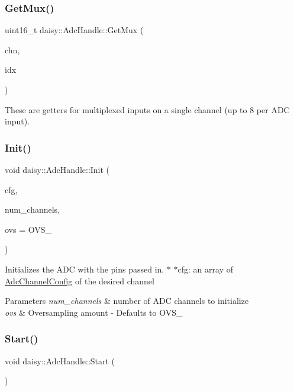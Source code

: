 \subsubsection{\texorpdfstring{Get\+Mux()}{GetMux()}}
{\footnotesize\ttfamily uint16\+\_\+t daisy\+::\+Adc\+Handle\+::\+Get\+Mux (\begin{DoxyParamCaption}\item[{uint8\+\_\+t}]{chn,  }\item[{uint8\+\_\+t}]{idx }\end{DoxyParamCaption})}

These are getters for multiplexed inputs on a single channel (up to 8 per A\+DC input). \mbox{\label{classdaisy_1_1_adc_handle_ab93340170ed44feced69fcdafc6c13ed}} 
\subsubsection{\texorpdfstring{Init()}{Init()}}
{\footnotesize\ttfamily void daisy\+::\+Adc\+Handle\+::\+Init (\begin{DoxyParamCaption}\item[{\hyperlink{structdaisy_1_1_adc_channel_config}{Adc\+Channel\+Config} $\ast$}]{cfg,  }\item[{size\+\_\+t}]{num\+\_\+channels,  }\item[{Over\+Sampling}]{ovs = {\ttfamily OVS\+\_} }\end{DoxyParamCaption})}

Initializes the A\+DC with the pins passed in. $\ast$ $\ast$cfg\+: an array of \hyperlink{structdaisy_1_1_adc_channel_config}{Adc\+Channel\+Config} of the desired channel 
\begin{DoxyParams}{Parameters}
{\em num\+\_\+channels} & number of A\+DC channels to initialize \\
\hline
{\em ovs} & Oversampling amount -\/ Defaults to O\+V\+S\+\_ \\
\hline
\end{DoxyParams}
\mbox{\label{classdaisy_1_1_adc_handle_a6fddddc75eb2d4ba0365a68d4bac2bd3}} 
\subsubsection{\texorpdfstring{Start()}{Start()}}
{\footnotesize\ttfamily void daisy\+::\+Adc\+Handle\+::\+Start (\begin{DoxyParamCaption}{ }\end{DoxyParamCaption})}

